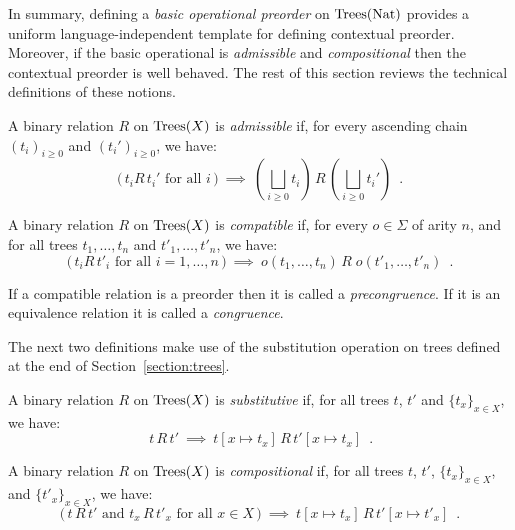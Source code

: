 
In summary, defining a \emph{basic operational preorder} on  $\textnormal{Trees}(\textnormal{Nat})$ provides a uniform language-independent template for defining contextual preorder. Moreover, if the basic operational is \emph{admissible} and \emph{compositional} then the 
contextual preorder is well behaved. The rest of this section reviews the technical definitions of these notions. 



\begin{definition}[Admissibility]
    A binary relation $R$ on $\textnormal{Trees}(X)$ is \emph{admissible} if,
    for every ascending chain $(t_i)_{i \geq 0}$ and 
    $(t_i')_{i\geq 0}$, we have:
    \[ \text{($\,t_i  R \, t_i'$ for all $i\,$)} ~ \implies~
        \left(\bigsqcup_{i \geq 0} t_i\right) \, R \, \left(\bigsqcup_{i \geq 0} t_i'\right) \enspace .
    \]
\end{definition}

\begin{definition}[Compatibility]
    A binary relation $R$ on $\textnormal{Trees}(X)$ is  \emph{compatible} if,
    for every $o \in \Sigma$ of arity $n$, and for all trees 
     $t_1,\dots, t_n$ and $t'_1, \dots, t'_n$, we have:
    \[ \text{($\,t_i  R \, t'_i$ for all $i = 1, \dots, n\,$)} ~ \implies ~ 
        o(t_1, \dots, t_n) \, R \; o(t'_1, \dots, t'_n) \enspace .
    \]
\end{definition}
If a compatible relation is a preorder then it is called a \emph{precongruence}. If it is an equivalence relation it is called a \emph{congruence}.

\noindent
The next two definitions make use of the substitution operation on trees defined at the end of
Section~\ref{section:trees}.
\begin{definition}[Substitutive]
    A binary relation $R$ on $\textnormal{Trees}(X)$ is  \emph{substitutive} if,
    for all trees $t$, $t'$ and $\{t_x\}_{x \in X}$, we have:
    \[ \text{$\,t\, R \, t'$} ~ \implies ~ 
       t[ x \mapsto t_x] \, R \, t'[ x \mapsto t_x] \enspace .
    \]
\end{definition}



\begin{definition}[Compositionality]
    A binary relation $R$ on $\textnormal{Trees}(X)$ is \emph{compositional} if, for all 
    trees $t$, $t'$,  $\{t_x\}_{x \in X}$,  and $\{t'_x\}_{x \in X}$, we have:
        \[ \text{($\,t \, R \, t'$ and $t_x \, R \, t'_x$ for all $x \in X\,$)} ~ \implies ~ 
        t[ x \mapsto t_x] \, R \, t'[ x \mapsto t'_x] \enspace .
    \]
\end{definition}




